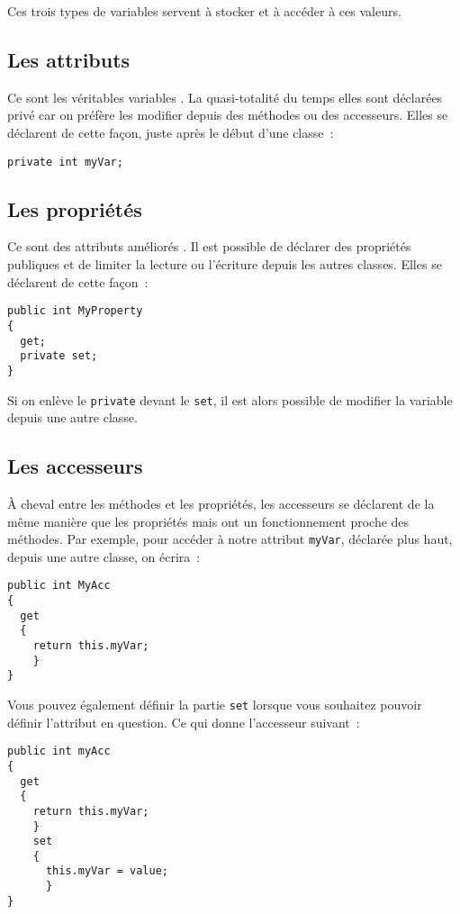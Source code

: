 Ces trois types de variables servent à stocker et à accéder à ces valeurs.

\subsection{Les attributs}

Ce sont les \og véritables variables \fg. La quasi-totalité du temps elles sont
déclarées privé car on préfère les modifier depuis des méthodes ou des
accesseurs. Elles se déclarent de cette façon, juste après le début d'une
classe~:

\begin{lstlisting}
private int myVar;
\end{lstlisting}

\subsection{Les propriétés}

Ce sont des attributs \og améliorés \fg. Il est possible de déclarer des
propriétés publiques et de limiter la lecture ou l'écriture depuis les autres
classes. Elles se déclarent de cette façon~:

\begin{lstlisting}
public int MyProperty
{
  get;
  private set;
}
\end{lstlisting}

Si on enlève le \verb+private+ devant le \verb+set+, il est alors possible de
modifier la variable depuis une autre classe.

\subsection{Les accesseurs}

À cheval entre les méthodes et les propriétés, les accesseurs se déclarent de
la même manière que les propriétés mais ont un fonctionnement proche des
méthodes. Par exemple, pour accéder à notre attribut \verb+myVar+, déclarée
plus haut, depuis une autre classe, on écrira~:

\begin{lstlisting}
public int MyAcc
{
  get
  {
    return this.myVar;
    }
}
\end{lstlisting}

Vous pouvez également définir la partie \verb+set+ lorsque vous souhaitez
pouvoir définir l'attribut en question. Ce qui donne l'accesseur suivant~:

\begin{lstlisting}
public int myAcc
{
  get
  {
    return this.myVar;
    }
    set
    {
      this.myVar = value;
      }
}
\end{lstlisting}

